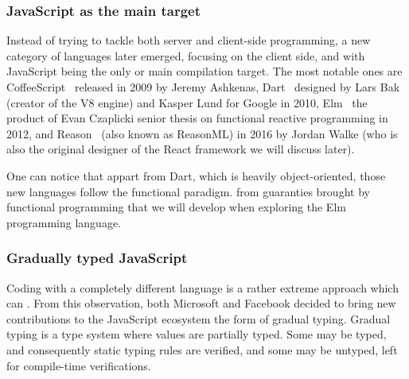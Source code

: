\subsubsection{JavaScript as the main target}%
\label{ssub:javascript_as_the_main_target}

Instead of trying to tackle both server and client-side programming,
a new category of languages later emerged, focusing on the client side,
and with JavaScript being the only or main compilation target.
The most notable ones are CoffeeScript~\cite{coffeescript} released in 2009
by Jeremy Ashkenas, Dart~\cite{dart-blog} designed by Lars Bak
(creator of the V8 engine) and Kasper Lund for Google in 2010,
Elm~\cite{czaplicki2013asynchronous} the product of Evan Czaplicki senior thesis
on functional reactive programming in 2012,
and Reason~\cite{reason} (also known as ReasonML) in 2016 by Jordan Walke (who is
also the original designer of the React framework we will discuss later).

One can notice that appart from Dart, which is heavily object-oriented,
those new languages  follow the functional paradigm.
 from guaranties brought by
functional programming that we will develop when exploring the Elm programming language.



\subsubsection{Gradually typed JavaScript}%
\label{ssub:gradually_typed_javascript}

Coding with a completely different language is a rather extreme approach
which can .
From this observation, both Microsoft and Facebook decided to bring
new contributions to the JavaScript ecosystem  the form of gradual typing.
Gradual typing is a type system where values are partially typed.
Some may be typed, and consequently static typing rules are verified,
and some may be untyped, left for compile-time verifications.

